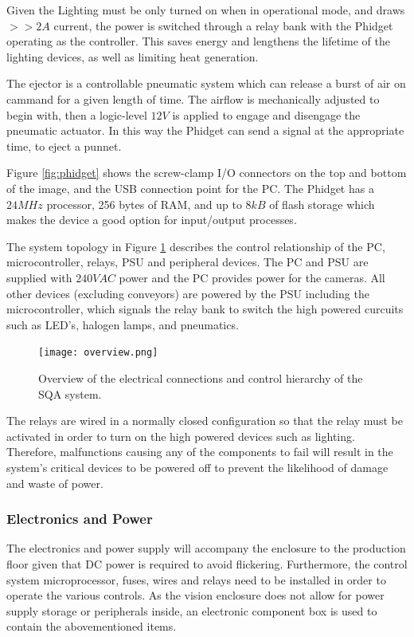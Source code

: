 \documentclass[fleqn,twoside]{article}
\begin{document}
Given the Lighting must be only turned on when in operational mode, and draws $>>2A$ current, the power is switched through a relay bank with the Phidget operating as the controller. This saves energy and lengthens the lifetime of the lighting devices, as well as limiting heat generation.

The ejector is a controllable pneumatic system which can release a burst of air on cammand for a given length of time. The airflow is mechanically adjusted to begin with, then a logic-level $12V$ is applied to engage and disengage the pneumatic actuator. In this way the Phidget can send a signal at the appropriate time, to eject a punnet.


Figure \ref{fig:phidget} shows the screw-clamp I/O connectors on the top and bottom of the image, and the USB connection point for the PC. The Phidget has a $24MHz$ processor, 256 bytes of RAM, and up to $8kB$ of flash storage which makes the device a good option for input/output processes.
 


The system topology in Figure \ref{fig:overview} describes the control relationship of the PC, microcontroller, relays, PSU and peripheral devices. The PC and PSU are supplied with $240VAC$ power and the PC provides power for the cameras. All other devices (excluding conveyors) are powered by the PSU including the microcontroller, which signals the relay bank to switch the high powered curcuits such as LED's, halogen lamps, and pneumatics. 


\begin{figure}[h]
	\centering
	\texttt{[image: overview.png]}
	\caption{Overview of the electrical connections and control hierarchy of the SQA system.}
	\label{fig:overview}
\end{figure} 

The relays are wired in a normally closed configuration so that the relay must be activated in order to turn on the high powered devices such as lighting. Therefore, malfunctions causing any of the components to fail will result in the system's critical devices to be powered off to prevent the likelihood of damage and waste of power.


\subsubsection{Electronics and Power}

The electronics and power supply will accompany the enclosure to the production floor given that DC power is required to avoid flickering. Furthermore, the control system microprocessor, fuses, wires and relays need to be installed in order to operate the various controls. As the vision enclosure does not allow for power supply storage or peripherals inside, an electronic component box is used to contain the abovementioned items. 
\end{document}
